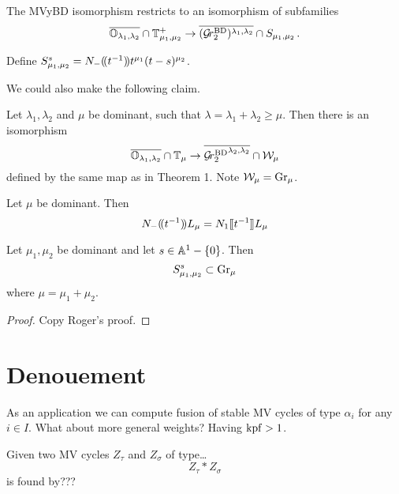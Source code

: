 \documentclass{article}
\begin{document}
\begin{corollary}
    The MVyBD isomorphism restricts to an isomorphism of subfamilies 
    \begin{equation}
        \overline{\OO_{\lambda_1,\lambda_2}}\cap\TT_{\mu_1,\mu_2}^+ \to \overline{(\Grbd[2])^{\lambda_1,\lambda_2}}\cap S_{\mu_1,\mu_2}\,. 
    \end{equation}
\end{corollary}

Define $S_{\mu_1,\mu_2}^s = N_-\xT[t^{-1}] t^{\mu_1} (t-s)^{\mu_2}$. 


We could also make the following claim. 
\begin{theorem}
    Let $\lambda_1,\lambda_2$ and $\mu$ be dominant, such that $\lambda = \lambda_1 + \lambda_2 \ge \mu$. Then there is an isomorphism 
    \begin{equation}
        \overline{\OO_{\lambda_1,\lambda_2}} \cap \TT_\mu \to \overline{\Grbd[2]^{\lambda_2,\lambda_2}}\cap\cW_\mu 
    \end{equation}
    defined by the same map as in Theorem 1. 
    Note $\cW_\mu = \Gr_\mu$. 
\end{theorem}

\begin{lemma}[KWWY14]
    Let $\mu$ be dominant. Then 
    \begin{equation}
        N_{-}\xT[t^{-1}] L_\mu = N_1\xt[t^{-1}]L_\mu
    \end{equation}
\end{lemma}

\begin{lemma}%
    Let $\mu_1,\mu_2$ be dominant and let $s\in \AA^1 - \{0\}$. Then 
    \begin{equation}
        S_{\mu_1,\mu_2}^s \subset \Gr_\mu 
    \end{equation}
    where $\mu = \mu_1 + \mu_2$.
\end{lemma}

\begin{proof}
    Copy Roger's proof.
\end{proof}

\section{Denouement}

As an application we can compute fusion of stable MV cycles of type $\alpha_i$ for any $i \in I$. What about more general weights? Having $\kpf > 1$.

\begin{proposition}
    Given two MV cycles $Z_\tau$ and $Z_\sigma$ of type\dots 
    \begin{equation}
        Z_\tau\ast Z_\sigma 
    \end{equation}
    is found by??? 
\end{proposition}
\end{document}
